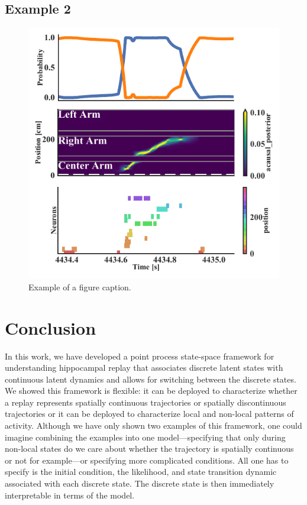 \documentclass[conference]{IEEEtran}
\begin{document}
\subsection{Example 2}
\begin{figure}[ht]
\centerline{\includegraphics{fig2.pdf}}
\caption{Example of a figure caption.}
\label{fig}
\end{figure}
\section{Conclusion}
In this work, we have developed a point process state-space framework for understanding hippocampal replay that associates discrete latent states with continuous latent dynamics and allows for switching between the discrete states. We showed this framework is flexible: it can be deployed to characterize whether a replay represents spatially continuous trajectories or spatially discontinuous trajectories or it can be deployed to characterize local and non-local patterns of activity. Although we have only shown two examples of this framework, one could imagine combining the examples into one model---specifying that only during non-local states do we care about whether the trajectory is spatially continuous or not for example---or specifying more complicated conditions. All one has to specify is the initial condition, the likelihood, and state transition dynamic associated with each discrete state. The discrete state is then immediately interpretable in terms of the model.
\end{document}

